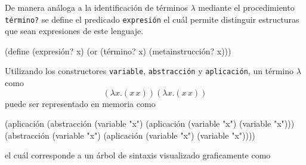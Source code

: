 \documentclass[letterpaper,twoside,openright,10pt]{book}
\begin{document}
De manera análoga a la identificación de términos \( λ \) mediante el procedimiento {\tt{}\protect{}término?} se define el predicado {\tt{}expresión} el cuál permite distinguir estructuras que sean expresiones de este lenguaje.

\nwenddocs{}\plusendmoddef
(define (expresión? x)
  (or (término? x)
      (metainstrucción? x)))
\eatline
{}\nwendcode{}\nwdocspar

Utilizando los constructores {\tt{}\protect{}variable}, {\tt{}\protect{}abstracción} y {\tt{}\protect{}aplicación}, un término \( λ \) como
\[ (λx.(x\, x)) (λx.(x\, x)) \]
puede ser representado en memoria como


\nwenddocs{}\endmoddef
(aplicación (abstracción (variable "x") (aplicación (variable "x") (variable "x")))
            (abstracción (variable "x") (aplicación (variable "x") (variable "x"))))
\nwendcode{}\nwdocspar

el cuál corresponde a un árbol de sintaxis visualizado graficamente como
\end{document}
